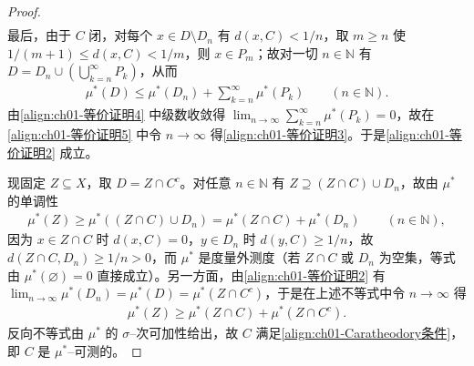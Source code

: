 \documentclass[../../main.tex]{subfiles}%
\begin{document}
\begin{proof}
\begin{align}
\end{align}
最后，由于 $C$ 闭，对每个 $x\in D\setminus D_n$ 有 $d(x,C)<1/n$，取 $m\geqslant n$ 使 $1/(m+1)\leqslant d(x,C)<1/m$，则 $x\in P_m$；故对一切 $n\in\mathbb{N}$ 有 $D=D_n\cup\left(\bigcup_{k=n}^\infty P_k\right)$，从而
\begin{align}
\mu^*(D)\leqslant\mu^*(D_n)+\sum_{k=n}^\infty\mu^*(P_k)\qquad(n\in\mathbb{N}). \label{align:ch01-等价证明5}
\end{align}
由\eqref{align:ch01-等价证明4} 中级数收敛得 $\lim_{n\to\infty}\sum_{k=n}^\infty\mu^*(P_k)=0$，故在\eqref{align:ch01-等价证明5} 中令 $n\to\infty$ 得\eqref{align:ch01-等价证明3}。于是\eqref{align:ch01-等价证明2} 成立。

现固定 $Z\subseteq X$，取 $D=Z\cap C^c$。对任意 $n\in\mathbb{N}$ 有 $Z\supseteq(Z\cap C)\cup D_n$，故由 $\mu^*$ 的单调性
\begin{align*}
\mu^*(Z)\geqslant\mu^*((Z\cap C)\cup D_n)=\mu^*(Z\cap C)+\mu^*(D_n)\qquad(n\in\mathbb{N}),
\end{align*}
因为 $x\in Z\cap C$ 时 $d(x,C)=0$，$y\in D_n$ 时 $d(y,C)\geqslant1/n$，故 $d(Z\cap C,D_n)\geqslant1/n>0$，而 $\mu^*$ 是度量外测度（若 $Z\cap C$ 或 $D_n$ 为空集，等式由 $\mu^*(\varnothing)=0$ 直接成立）。另一方面，由\eqref{align:ch01-等价证明2} 有 $\lim_{n\to\infty}\mu^*(D_n)=\mu^*(D)=\mu^*(Z\cap C^c)$，于是在上述不等式中令 $n\to\infty$ 得
\begin{align*}
\mu^*(Z)\geqslant\mu^*(Z\cap C)+\mu^*(Z\cap C^c).
\end{align*}
反向不等式由 $\mu^*$ 的 $\sigma$--次可加性给出，故 $C$ 满足\eqref{align:ch01-Caratheodory条件}，即 $C$ 是 $\mu^*$--可测的。
\end{proof}
\end{document}
